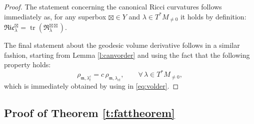 \documentclass[11pt,a4paper]{article}
\theoremstyle{plain}
\theoremstyle{definition}
\theoremstyle{remark}
\numberwithin{equation}{section}
\DeclareMathOperator{\tr}{\mathrm{tr}}
\newcommand{\mm}{\mathfrak m}
\begin{document}
\begin{proof}
The statement concerning the canonical Ricci curvatures follows immediately as, for any superbox $\boxtimes \in Y$ and $\lambda \in T^*M_{\neq 0}$ it holds by definition: $\mathfrak{Ric}_\lambda^\boxtimes = \tr (\mathfrak{R}_\lambda^{\boxtimes\boxtimes})$.

The final statement about the geodesic volume derivative follows in a similar fashion, starting from Lemma \ref{l:canvorder} and using the fact that the following property holds:
\begin{equation}
\rho_{\mm,\lambda^c_t} = c\,\rho_{\mm,\lambda_{ct}}, \qquad \forall\, \lambda \in T^*M_{\neq 0},
\end{equation}
which is immediately obtained by using \cite[Prop.\@ 4.9]{BR-Connection} in \eqref{eq:volder}.
\end{proof}



\subsection{Proof of Theorem \ref{t:fattheorem}}
\end{document}
